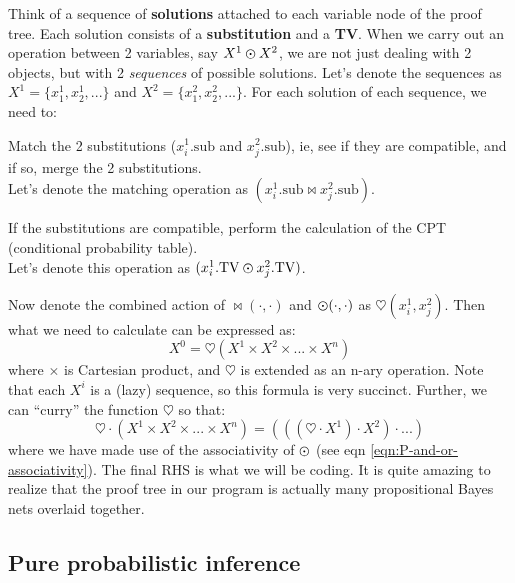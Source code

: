 Think of a sequence of \textbf{solutions} attached to each variable node of the proof tree.  Each solution consists of a \textbf{substitution} and a \textbf{TV}.  When we carry out an operation between 2 variables, say $X^1 \varodot X^2$, we are not just dealing with 2 objects, but with 2 \textit{sequences} of possible solutions.  Let's denote the sequences as $X^1 = \{ x^1_1, x^1_2, ... \} $ and $X^2 = \{ x^2_1, x^2_2, ... \}$.  For each solution of each sequence, we need to:
\begin{compactenum}[1.]
\item  Match the 2 substitutions ($x^1_i.\mbox{sub}$ and $x^2_j.\mbox{sub}$), ie, see if they are compatible, and if so, merge the 2 substitutions.\\
       Let's denote the matching operation as $(x^1_i.\mbox{sub} \bowtie x^2_j.\mbox{sub})$.
\item  If the substitutions are compatible, perform the calculation of the CPT (conditional probability table).\\
       Let's denote this operation as $(x^1_i.\mbox{TV} \varodot x^2_j.\mbox{TV})$.
\end{compactenum}
Now denote the combined action of $\bowtie(\cdot, \cdot)$ and $\varodot(\cdot, \cdot)$ as $\heartsuit(x^1_i, x^2_j)$.  Then what we need to calculate can be expressed as:
\begin{equation}
X^0 = \heartsuit( X^1 \times X^2 \times ... \times X^n)
\end{equation}
where $\times$ is Cartesian product, and $\heartsuit$ is extended as an n-ary operation.  Note that each $X^i$ is a (lazy) sequence, so this formula is very succinct.  Further, we can ``curry'' the function $\heartsuit$ so that:
\begin{equation}
\heartsuit \cdot ( X^1 \times X^2 \times ... \times X^n) = (((\heartsuit \cdot X^1) \cdot X^2) \cdot ... )
\end{equation}
where we have made use of the associativity of $\varodot$ (see eqn \ref{eqn:P-and-or-associativity}).  The final RHS is what we will be coding.  It is quite amazing to realize that the proof tree in our program is actually many propositional Bayes nets overlaid together.

\subsection{Pure probabilistic inference}
\label{sec:P-inference}

